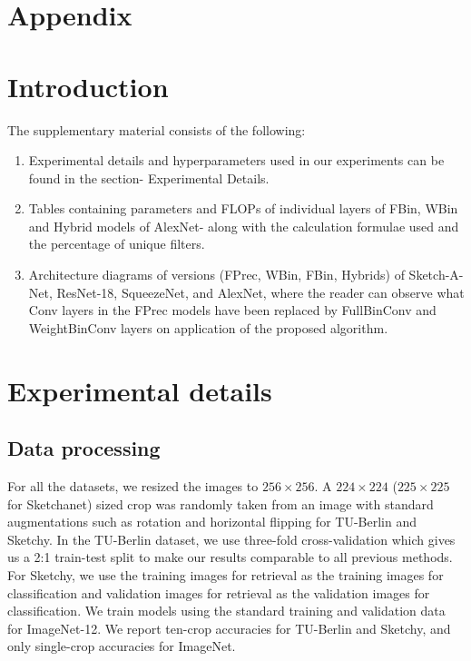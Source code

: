 \documentclass[10pt,twocolumn,letterpaper]{article}
\begin{document}
\section{Appendix}
\appendix\section{Introduction}
The supplementary material consists of the following:
\begin{enumerate}
\item Experimental details and hyperparameters used in our experiments can be found in the section- Experimental Details.
\item Tables containing parameters and FLOPs of individual layers of FBin, WBin and Hybrid models of AlexNet- along with the calculation formulae used and the percentage of unique filters.
\item Architecture diagrams of versions (FPrec, WBin, FBin, Hybrids) of Sketch-A-Net, ResNet-18, SqueezeNet, and AlexNet, where the reader can observe what Conv layers in the FPrec models have been replaced by FullBinConv and WeightBinConv layers on application of the proposed algorithm.
\end{enumerate}\section{Experimental details}\subsection{Data processing} 
For all the datasets, we resized the images to $256\times 256$. A $224\times 224$ ($225\times 225$  for Sketchanet) sized crop was randomly taken from an image with standard augmentations such as rotation and horizontal flipping for TU-Berlin and Sketchy. In the TU-Berlin dataset, we use three-fold cross-validation which gives us a 2:1 train-test split to make our results comparable to all previous methods. For Sketchy, we use the training images for retrieval as the training images for classification and validation images for retrieval as the validation images for classification. We train models using the standard training and validation data for ImageNet-12. We report ten-crop accuracies for TU-Berlin and Sketchy, and only single-crop accuracies for ImageNet.\\
\end{document}
